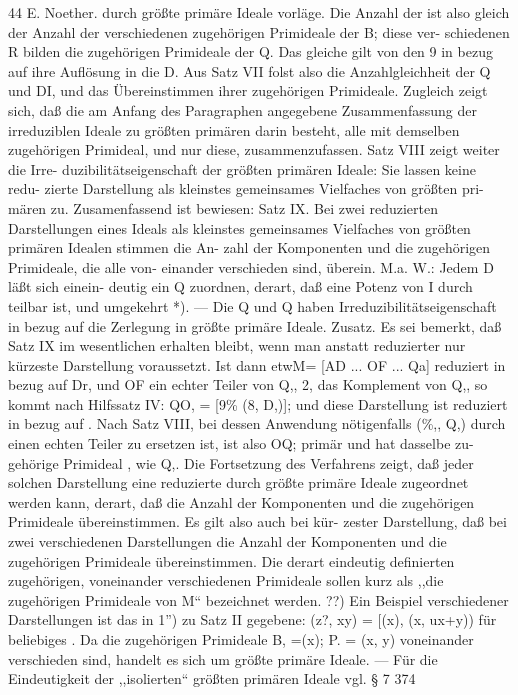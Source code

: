 \documentclass[11pt,a4paper]{article}
\theoremstyle{plain}
\theoremstyle{definition}
\begin{document}
44 
E. Noether. 
durch größte primäre Ideale vorläge. Die Anzahl \guillemotleft{} der  ist also gleich 
der Anzahl der verschiedenen zugehörigen Primideale  der B; diese ver- 
schiedenen R bilden die zugehörigen Primideale der Q. 
Das gleiche gilt 
von den 9 in bezug auf ihre Auflösung in die D. 
Aus Satz VII folst 
also die Anzahlgleichheit der Q und DI, und das Übereinstimmen ihrer 
zugehörigen Primideale. 
Zugleich zeigt sich, daß die am Anfang 
des 
Paragraphen 
angegebene 
Zusammenfassung 
der 
irreduziblen 
Ideale 
zu 
größten primären darin besteht, alle mit demselben zugehörigen Primideal, 
und nur 
diese, 
zusammenzufassen. 
Satz 
VIII 
zeigt 
weiter 
die 
Irre- 
duzibilitätseigenschaft der größten primären Ideale: Sie lassen keine redu- 
zierte Darstellung 
als kleinstes gemeinsames Vielfaches von größten pri- 
mären zu. 
Zusamenfassend ist bewiesen: 
Satz IX. Bei zwei reduzierten Darstellungen eines Ideals als kleinstes 
gemeinsames Vielfaches von größten primären Idealen stimmen die An- 
zahl der Komponenten 
und die zugehörigen Primideale, 
die alle von- 
einander verschieden sind, überein. 
M.a. W.: Jedem D läßt sich einein- 
deutig ein Q zuordnen, derart, daß eine Potenz von I durch  teilbar 
ist, und umgekehrt *). --- Die Q und Q haben Irreduzibilitätseigenschaft in 
bezug auf die Zerlegung in größte primäre Ideale. 
Zusatz. 
Es sei bemerkt, daß Satz IX im wesentlichen erhalten bleibt, 
wenn man anstatt reduzierter nur kürzeste Darstellung voraussetzt. 
Ist dann 
etwM= [AD ... OF ... Qa] reduziert in bezug auf Dr, und OF ein echter 
Teiler von Q,, 2, das Komplement von Q,, so kommt nach Hilfssatz IV: 
QO, = [9\% (8, D,)]; und diese Darstellung ist reduziert in bezug auf . 
Nach Satz VIII, bei dessen Anwendung nötigenfalls (\%,, Q,) durch einen 
echten Teiler zu ersetzen 
ist, 
ist also OQ; primär und 
hat dasselbe 
zu- 
gehörige Primideal , wie Q,. Die Fortsetzung des Verfahrens zeigt, daß 
jeder solchen Darstellung 
eine reduzierte 
durch größte primäre Ideale 
zugeordnet werden kann, derart, daß die Anzahl der Komponenten und 
die zugehörigen Primideale übereinstimmen. 
Es gilt also auch bei kür- 
zester Darstellung, daß bei zwei verschiedenen Darstellungen die Anzahl 
der Komponenten und die zugehörigen Primideale übereinstimmen. 
Die derart eindeutig definierten zugehörigen, voneinander verschiedenen 
Primideale sollen kurz als ,,die zugehörigen Primideale von M`` bezeichnet 
werden. 
??) Ein Beispiel verschiedener Darstellungen ist das in 1'') zu Satz II gegebene: 
(z?, xy) = [(x), (x, ux+y)) für beliebiges \guillemotleft{}. Da die zugehörigen Primideale B, =(x); 
P. = (x, y) voneinander verschieden sind, handelt es sich um größte primäre Ideale. 
--- Für die Eindeutigkeit der ,,isolierten`` größten primären Ideale vgl. \S{} 7 
374
\end{document}
